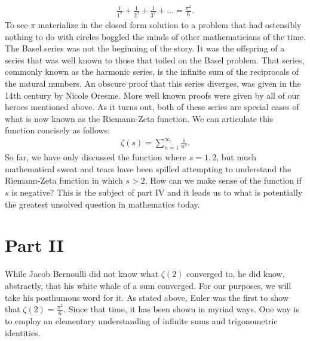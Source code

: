 \documentclass[12pt,oneside]{amsart}
\theoremstyle{definition}
\theoremstyle{remark}
\numberwithin{equation}{exer}
\begin{document}
\begin{align*}
    \frac{1}{1^2} + \frac{1}{2^2} + \frac{1}{3^2} + \dots = \frac{\pi^2}{6}.
\end{align*}
To see $\pi$ materialize in the closed form solution to a problem that had ostensibly nothing to do with circles boggled the minds of other mathematicians of the time.
\newline \indent
The Basel series was not the beginning of the story. It was the offspring of a series that was well known to those that toiled on the Basel problem. That series, commonly known as the harmonic series, is the infinite sum of the reciprocals of the natural numbers. An obscure proof that this series diverges, was given in the 14th century by Nicole Oresme. More well known proofs were given by all of our heroes mentioned above. As it turns out, both of these series are special cases of what is now known as the Riemann-Zeta function. We can articulate this function concisely as follows: 
\begin{align}
    \zeta(s) = \sum_{n=1}^\infty \frac{1}{n^s}.
\end{align}
So far, we have only discussed the function where $s=1,2$, but much mathematical sweat and tears have been spilled attempting to understand the Riemann-Zeta function in which $s>2$. How can we make sense of the function if $s$ is negative? This is the subject of part IV and it leads us to what is potentially the greatest unsolved question in mathematics today.




\newpage
\section*{Part II}

\newline \indent 
While Jacob Bernoulli did not know what $\zeta (2)$ converged to, he did know, abstractly, that his white whale of a sum converged. For our purposes, we will take his posthumous word for it. As stated above, Euler was the first to show that $\zeta(2)= \frac{\pi^2}{6}$. Since that time, it has been shown in myriad ways. One way is to employ an elementary understanding of infinite sums and trigonometric identities. 
\end{document}
